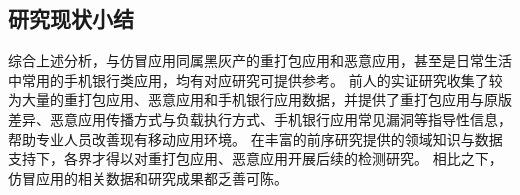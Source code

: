 
\subsection{研究现状小结}
综合上述分析，与仿冒应用同属黑灰产的重打包应用和恶意应用，甚至是日常生活中常用的手机银行类应用，均有对应研究可提供参考。
前人的实证研究收集了较为大量的重打包应用、恶意应用和手机银行应用数据，并提供了重打包应用与原版差异、恶意应用传播方式与负载执行方式、手机银行应用常见漏洞等指导性信息，帮助专业人员改善现有移动应用环境。
在丰富的前序研究提供的领域知识与数据支持下，各界才得以对重打包应用、恶意应用开展后续的检测研究。
相比之下，仿冒应用的相关数据和研究成果都乏善可陈。

